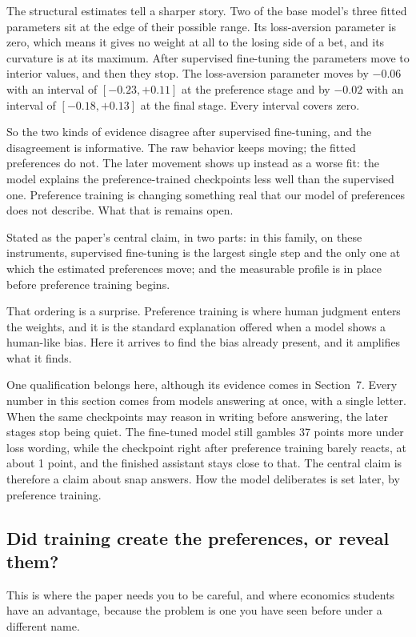 \documentclass[11pt]{article}
\begin{document}
The structural estimates tell a sharper story. Two of the base model's three fitted parameters
sit at the edge of their possible range. Its loss-aversion parameter is zero, which means it gives
no weight at all to the losing side of a bet, and its curvature is at its maximum. After
supervised fine-tuning the parameters move to interior values, and then they stop. The
loss-aversion parameter moves by $-0.06$ with an interval of $[-0.23, +0.11]$ at the preference
stage and by $-0.02$ with an interval of $[-0.18, +0.13]$ at the final stage. Every interval
covers zero.

So the two kinds of evidence disagree after supervised fine-tuning, and the disagreement is
informative. The raw behavior keeps moving; the fitted preferences do not. The later movement
shows up instead as a worse fit: the model explains the preference-trained checkpoints less well
than the supervised one. Preference training is changing something real that our model of
preferences does not describe. What that is remains open.

Stated as the paper's central claim, in two parts: in this family, on these instruments,
supervised fine-tuning is the largest single step and the only one at which the estimated
preferences move; and the measurable profile is in place before preference training begins.

That ordering is a surprise. Preference training is where human judgment enters the weights, and
it is the standard explanation offered when a model shows a human-like bias. Here it arrives to
find the bias already present, and it amplifies what it finds.

One qualification belongs here, although its evidence comes in Section~7. Every number in this
section comes from models answering at once, with a single letter. When the same checkpoints may
reason in writing before answering, the later stages stop being quiet. The fine-tuned model still
gambles 37 points more under loss wording, while the checkpoint right after preference training
barely reacts, at about 1 point, and the finished assistant stays close to that. The central claim is therefore a
claim about snap answers. How the model deliberates is set later, by preference training.

\subsection{Did training create the preferences, or reveal them?}

This is where the paper needs you to be careful, and where economics students have an advantage,
because the problem is one you have seen before under a different name.
\end{document}
